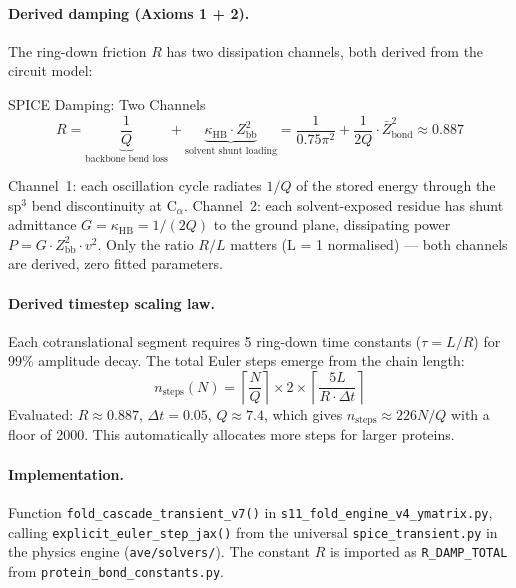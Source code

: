 \paragraph{Derived damping (Axioms 1 + 2).}
The ring-down friction $R$ has two dissipation channels, both
derived from the circuit model:
\begin{resultbox}{SPICE Damping: Two Channels}
\begin{equation}
    R = \underbrace{\frac{1}{Q}}_{\text{backbone bend loss}}
      + \underbrace{\kappa_\text{HB} \cdot Z_\text{bb}^2}_{\text{solvent shunt loading}}
    = \frac{1}{0.75\pi^2}
      + \frac{1}{2Q} \cdot \bar{Z}_\text{bond}^2
    \approx 0.887
    \label{eq:R_damp_total}
\end{equation}
\end{resultbox}
\noindent Channel~1: each oscillation cycle radiates $1/Q$ of the stored
energy through the sp$^3$ bend discontinuity at C$_\alpha$.
Channel~2: each solvent-exposed residue has shunt admittance
$G = \kappa_\text{HB} = 1/(2Q)$ to the ground plane, dissipating
power $P = G \cdot Z_\text{bb}^2 \cdot v^2$.  Only the ratio $R/L$
matters (L = 1 normalised) --- both channels are derived, zero fitted
parameters.

\paragraph{Derived timestep scaling law.}
Each cotranslational segment requires 5 ring-down time constants
($\tau = L/R$) for 99\% amplitude decay.  The total Euler steps
emerge from the chain length:
\begin{equation}
    n_\text{steps}(N) = \left\lceil \frac{N}{Q} \right\rceil
    \times 2 \times \left\lceil \frac{5L}{R \cdot \Delta t} \right\rceil
    \label{eq:n_steps_scaling}
\end{equation}
Evaluated: $R \approx 0.887$, $\Delta t = 0.05$, $Q \approx 7.4$,
which gives $n_\text{steps} \approx 226 N/Q$ with a floor of 2000.
This automatically allocates more steps for larger proteins.

\paragraph{Implementation.}
Function \texttt{fold\_cascade\_transient\_v7()} in \texttt{s11\_fold\_engine\_v4\_ymatrix.py},
calling \texttt{explicit\_euler\_step\_jax()} from the universal \texttt{spice\_transient.py}
in the physics engine (\texttt{ave/solvers/}).  The constant $R$ is imported
as \texttt{R\_DAMP\_TOTAL} from \texttt{protein\_bond\_constants.py}.


